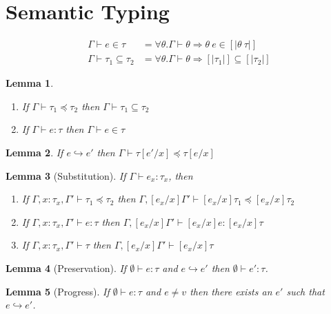 \documentclass[10pt,a4paper]{article}
\newtheorem{lemma}{Lemma}
\newcommand\sub[2]{\ensuremath{\left[ #2 / #1 \right]}}
\newcommand\interp[1]{\ensuremath{[|#1|]}}
\newcommand\eval[2]{\ensuremath{#1 \hookrightarrow #2}}
\newcommand\hastype[3]{\ensuremath{#1 \vdash #2 \colon #3}}
\newcommand\shastype[3]{\ensuremath{#1 \vdash #2 \in #3}}
\newcommand\iswellformed[2]{\ensuremath{#1 \vdash #2}}
\newcommand\issubtype[3]{\ensuremath{#1 \vdash #2 \preceq #3}}
\newcommand\sissubtype[3]{\ensuremath{#1 \vdash #2 \subseteq #3}}
\begin{document}
\section*{Semantic Typing}
\begin{align*}
\shastype{\Gamma}{e}{\tau} & = 
	\forall \theta . \iswellformed{\Gamma}{\theta} \Rightarrow \theta\ e \in \interp{\theta \ \tau}\\
\sissubtype{\Gamma}{\tau_1}{\tau_2} & = 
	\forall \theta . \iswellformed{\Gamma}{\theta} \Rightarrow \interp{\tau_1} \subseteq \interp{\tau_2}
\end{align*}


\begin{lemma}
\begin{enumerate}
\item If \issubtype{\Gamma}{\tau_1}{\tau_2} then \sissubtype{\Gamma}{\tau_1}{\tau_2} 
\item If \hastype{\Gamma}{e}{\tau} then \shastype{\Gamma}{e}{\tau} 
\end{enumerate}
\end{lemma}

\begin{lemma}
If \eval{e}{e'} then \issubtype{\Gamma}{\tau\sub{x}{e'}}{\tau\sub{x}{e}}
\end{lemma}


\begin{lemma}[Substitution]
If \hastype{\Gamma}{e_x}{\tau_x}, then 
\begin{enumerate}
\item If 
	\issubtype{\Gamma, x\colon\tau_x, \Gamma'}{\tau_1}{\tau_2}
	then
	\issubtype{\Gamma, \sub{x}{e_x}\Gamma'}{\sub{x}{e_x}\tau_1}{\sub{x}{e_x}\tau_2}
\item If 
	\hastype{\Gamma, x\colon\tau_x, \Gamma'}{e}{\tau}
	then
	\hastype{\Gamma, \sub{x}{e_x}\Gamma'}{\sub{x}{e_x}e}{\sub{x}{e_x}\tau}
\item If 
	\iswellformed{\Gamma, x\colon\tau_x, \Gamma'}{\tau}
	then
	\iswellformed{\Gamma, \sub{x}{e_x}\Gamma'}{\sub{x}{e_x}\tau}
\end{enumerate}
\end{lemma}


\begin{lemma}[Preservation]
If \hastype{\emptyset}{e}{\tau} and \eval{e}{e'} then \hastype{\emptyset}{e'}{\tau}.
\end{lemma}
\begin{lemma}[Progress]
If \hastype{\emptyset}{e}{\tau} and $e \neq v$ then there exists an $e'$ such that \eval{e}{e'}.
\end{lemma}
\end{document}
